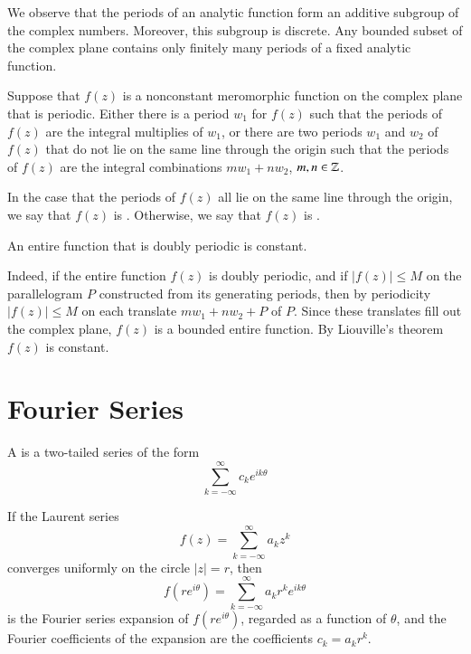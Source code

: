 \documentclass[12pt, a4paper, oneside, openright, titlepage]{book}
\begin{document}
We observe that the periods of an analytic function form an additive subgroup of the complex numbers. Moreover, this subgroup is discrete. Any bounded subset of the complex plane contains only finitely many periods of a fixed analytic function.

\begin{thm}
    Suppose that $f(z)$ is a nonconstant meromorphic function on the complex plane that is periodic. Either there is a period $w_1$ for $f(z)$ such that the periods of $f(z)$ are the integral multiplies of $w_1$, or there are two periods $w_1$ and $w_2$ of $f(z)$ that do not lie on the same line through the origin such that the periods of $f(z)$ are the integral combinations $mw_1+nw_2$, $m,n \in \mathbb Z$.
\end{thm}

In the case that the periods of $f(z)$ all lie on the same line through the origin, we say that $f(z)$ is . Otherwise, we say that $f(z)$ is .

\begin{thm}
    An entire function that is doubly periodic is constant.
\end{thm}
Indeed, if the entire function $f(z)$ is doubly periodic, and if $|f(z)| \leq M$ on the parallelogram $P$ constructed from its generating periods, then by periodicity $|f(z)| \leq M$ on each translate $mw_1+nw_2 + P$ of $P$. Since these translates fill out the complex plane, $f(z)$ is a bounded entire function. By Liouville's theorem $f(z)$ is constant.




\section{Fourier Series}

\begin{defn}
    A  is a two-tailed series of the form \begin{equation}
        \sum_{k=-\infty}^{\infty}c_ke^{ik\theta}
    \end{equation}
\end{defn}

If the Laurent series \begin{equation*}
    f(z) = \sum_{k=-\infty}^{\infty}a_kz^k
\end{equation*}
converges uniformly on the circle $|z| = r$, then \begin{equation*}
    f(re^{i\theta}) = \sum_{k=-\infty}^{\infty}a_kr^ke^{ik\theta}
\end{equation*}
is the Fourier series expansion of $f(re^{i\theta})$, regarded as a function of $\theta$, and the Fourier coefficients of the expansion are the coefficients $c_k = a_kr^k$.
\end{document}
